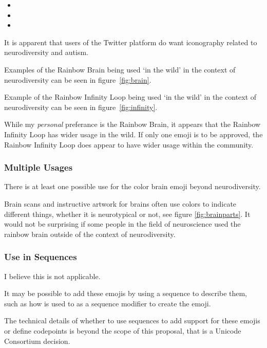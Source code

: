 \begin{itemize}
  \item {}
  \item {}
  \item {}
\end{itemize}

It is apparent that users of the Twitter platform do want iconography related to neurodiversity
and autism.

Examples of the Rainbow Brain being used `in the wild' in the context of neurodiversity can be
seen in figure~\ref{fig:brain}.

Example of the Rainbow Infinity Loop being used `in the wild' in the context of neurodiversity
can be seen in figure~\ref{fig:infinity}.

While my \emph{personal} preferance is the Rainbow Brain, it appears that the Rainbow
Infinity Loop has wider usage in the wild. If only one emoji is to be approved, the Rainbow
Infinity Loop does appear to have wider usage within the community.


\subsubsection{Multiple Usages}

There is at least one possible use for the color brain emoji beyond neurodiversity.

Brain scans and instructive artwork for brains often use colors to indicate different things,
whether it is neurotypical or not, see figure \ref{fig:brainparts}. It would not be surprising
if some people in the field of neuroscience used the rainbow brain outside of the context
of neurodiversity.


\subsubsection{Use in Sequences}

I believe this is not applicable.

It may be possible to add these emojis by using a sequence to describe them, such as how
\rainbow{} is used to as a sequence modifier to create the
\prideflag{} emoji.

The technical details of whether to use sequences to add support for these emojis or define
codepoints is beyond the scope of this proposal, that is a Unicode Consortium decision.

